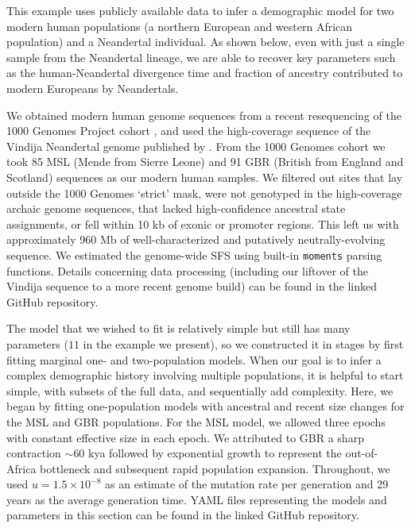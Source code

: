 \documentclass[]{article}
\newcommand{\moments}{\texttt{moments}\xspace}
\begin{document}
This example uses publicly available data to infer a demographic model for two
modern human populations (a northern European and western African population) 
and a Neandertal individual. As shown below, even with just a single sample 
from the Neandertal lineage, we are able to recover key parameters such as the
human-Neandertal divergence time and fraction of ancestry contributed to modern 
Europeans by Neandertals.

We obtained modern human genome sequences from a recent resequencing of the 
1000 Genomes Project cohort \cite{byrska2022high}, and used the high-coverage 
sequence of the Vindija Neandertal genome published by \cite{prufer2017high}. 
From the 1000 Genomes cohort we took 85 MSL (Mende from Sierre Leone) and 91 
GBR (British from England and Scotland) sequences as our modern human samples.  
We filtered out sites that lay outside the 1000 Genomes `strict' mask, 
were not genotyped in the high-coverage archaic genome sequences, 
that lacked high-confidence ancestral state assignments, or fell within 10 kb of 
exonic or promoter regions. This left us with approximately 960 Mb of 
well-characterized and putatively neutrally-evolving sequence.
We estimated the genome-wide SFS using built-in \moments parsing functions.
Details concerning data processing (including our liftover of the Vindija 
sequence to a more recent genome build) can be found in the linked GitHub 
repository.

The model that we wished to fit is relatively simple but still has many
parameters ($11$ in the example we present), so we constructed it in stages by
first fitting marginal one- and two-population models. When our goal is to infer 
a complex demographic history involving multiple populations, it is helpful to 
start simple, with subsets of the full data, and sequentially add complexity.  
Here, we began by fitting one-population models with ancestral and recent size 
changes for the MSL and GBR populations.  For the MSL model, we allowed three 
epochs with constant effective size in each epoch. We attributed to GBR a sharp 
contraction $\sim$60 kya followed by exponential growth to represent the 
out-of-Africa bottleneck and subsequent rapid population expansion.  Throughout, 
we used $u=1.5\times 10^{-8}$ as an estimate of the mutation rate per generation 
and 29 years as the average generation time. YAML files representing the models 
and parameters in this section can be found in the linked GitHub repository.
\end{document}
